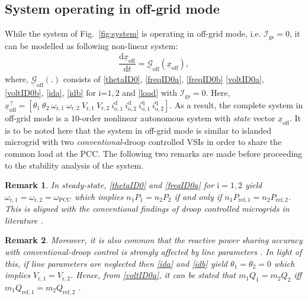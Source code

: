 \documentclass[journal]{IEEEtran}
\newtheorem{remark}{Remark}
\begin{document}
\subsection{System operating in off-grid mode}
While the system of Fig.~\ref{fig:system} is operating in off-grid mode, i.e. $\mathcal{I}_\mathrm{gs}=0$, it can be modelled as following non-linear system:
\begin{align}\label{offgridmodel}
    \dfrac{\mathrm{d}\underline{x}_\mathrm{off}}{\mathrm{d}t}=\underline{\mathcal{G}}_\mathrm{off}(\underline{x}_\mathrm{off}),
\end{align}
where, $\underline{\mathcal{G}}_\mathrm{off}(.)$ consists of \eqref{thetaID0}, \eqref{freqID0a}, \eqref{freqID0b} \eqref{voltID0a}, \eqref{voltID0b}, \eqref{ida}, \eqref{idb} for $\mathrm{i}$=$1,2$ and \eqref{load} with $\mathcal{I}_\mathrm{gs}=0$. Here, $\underline{x}_\mathrm{off}^\top=[\theta_\mathrm{1}~\theta_\mathrm{2}~\omega_\mathrm{r,1}~\omega_\mathrm{r,2}~V_\mathrm{r,1}~V_\mathrm{r,2}~i_\mathrm{o,1}^\mathrm{d}~i_\mathrm{o,2}^\mathrm{d}~i_\mathrm{o,1}^\mathrm{q}~i_\mathrm{o,2}^\mathrm{q}]$. As a result, the complete system in off-grid mode is a $10$-order nonlinear autonomous system with \textit{state} vector $\underline{x}_\mathrm{off}$. It is to be noted here that the system in off-grid mode is similar to islanded microgrid with two \textit{conventional}-droop controlled VSIs in order to share the common load at the PCC. The following two remarks are made before proceeding to the stability analysis of the system.
\begin{remark}\label{remark4}
In steady-state, \eqref{thetaID0} and \eqref{freqID0a} for $\mathrm{i}=1,2$ yield $\omega_\mathrm{r,1}=\omega_\mathrm{r,2}=\omega_\mathrm{PCC}$ which implies $n_\mathrm{1}P_\mathrm{1}=n_\mathrm{2}P_\mathrm{2}$ if and only if $n_\mathrm{1}P_\mathrm{ref,1}=n_\mathrm{2}P_\mathrm{ref,2}$. This is aligned with the conventional findings of droop controlled microgrids in literature \cite{chandorkar}.
\end{remark}
\begin{remark}\label{remark5}
Moreover, it is also common that the reactive power sharing accuracy with \textit{conventional}-droop control is strongly affected by line parameters \cite{gurrero1}. In light of this, if line parameters are neglected then \eqref{ida} and \eqref{idb} yield $\theta_\mathrm{1}=\theta_\mathrm{2}=0$ which implies $V_\mathrm{r,1}=V_\mathrm{r,2}$. Hence, from \eqref{voltID0a}, it can be stated that $m_\mathrm{1}Q_\mathrm{1}=m_\mathrm{2}Q_\mathrm{2}$ \textit{iff} $m_\mathrm{1}Q_\mathrm{ref,1}=m_\mathrm{2}Q_\mathrm{ref,2}$ \cite{chandorkar}.
\end{remark}
\end{document}
